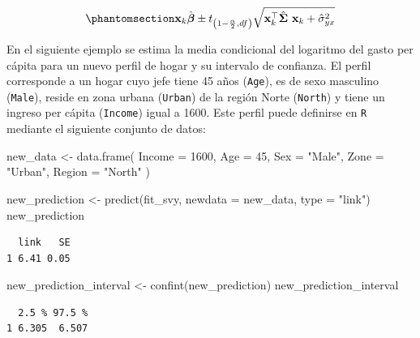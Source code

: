 \documentclass[
  spanish,
  11pt,
  letterpaper,
  oneside,
  open=any]{scrbook}
\newenvironment{Shaded}{\begin{snugshade}}{\end{snugshade}}
\newcommand{\AttributeTok}[1]{\textcolor[rgb]{0.40,0.45,0.13}{#1}}
\newcommand{\DecValTok}[1]{\textcolor[rgb]{0.68,0.00,0.00}{#1}}
\newcommand{\FunctionTok}[1]{\textcolor[rgb]{0.28,0.35,0.67}{#1}}
\newcommand{\NormalTok}[1]{\textcolor[rgb]{0.00,0.23,0.31}{#1}}
\newcommand{\OtherTok}[1]{\textcolor[rgb]{0.00,0.23,0.31}{#1}}
\newcommand{\StringTok}[1]{\textcolor[rgb]{0.13,0.47,0.30}{#1}}
\begin{document}
\begin{equation}\protect\phantomsection\label{eq-intervalo-prediccion}{
\mathbf{x}_{k}\hat{\boldsymbol{\beta}}
\pm
t_{\left(1-\frac{\alpha}{2},df\right)}
\sqrt{
\mathbf{x}_{k}^{\top}
\hat{\boldsymbol{\Sigma}} \
\mathbf{x}_{k}
+
\hat{\sigma}^2_{yx}
}
}\end{equation}

En el siguiente ejemplo se estima la media condicional del logaritmo del
gasto per cápita para un nuevo perfil de hogar y su intervalo de
confianza. El perfil corresponde a un hogar cuyo jefe tiene 45 años
(\texttt{Age}), es de sexo masculino (\texttt{Male}), reside en zona
urbana (\texttt{Urban}) de la región Norte (\texttt{North}) y tiene un
ingreso per cápita (\texttt{Income}) igual a 1600. Este perfil puede
definirse en \texttt{R} mediante el siguiente conjunto de datos:

\begin{Shaded}
\begin{Highlighting}[]
\NormalTok{new\_data }\OtherTok{\textless{}{-}} \FunctionTok{data.frame}\NormalTok{(}
  \AttributeTok{Income =} \DecValTok{1600}\NormalTok{,}
  \AttributeTok{Age =} \DecValTok{45}\NormalTok{,}
  \AttributeTok{Sex =} \StringTok{"Male"}\NormalTok{,}
  \AttributeTok{Zone =} \StringTok{"Urban"}\NormalTok{,}
  \AttributeTok{Region =} \StringTok{"North"}
\NormalTok{)}

\NormalTok{new\_prediction }\OtherTok{\textless{}{-}} \FunctionTok{predict}\NormalTok{(fit\_svy, }\AttributeTok{newdata =}\NormalTok{ new\_data, }\AttributeTok{type =} \StringTok{"link"}\NormalTok{)}
\NormalTok{new\_prediction}
\end{Highlighting}
\end{Shaded}

\begin{verbatim}
  link   SE
1 6.41 0.05
\end{verbatim}

\begin{Shaded}
\begin{Highlighting}[]
\NormalTok{new\_prediction\_interval }\OtherTok{\textless{}{-}} \FunctionTok{confint}\NormalTok{(new\_prediction)}
\NormalTok{new\_prediction\_interval}
\end{Highlighting}
\end{Shaded}

\begin{verbatim}
  2.5 % 97.5 %
1 6.305  6.507
\end{verbatim}
\end{document}
